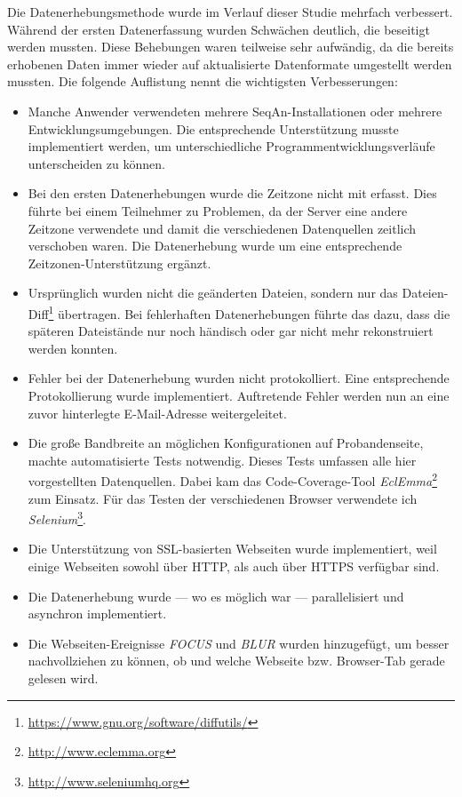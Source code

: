Die Datenerhebungsmethode wurde im Verlauf dieser Studie mehrfach verbessert. Während der ersten Datenerfassung wurden Schwächen deutlich, die beseitigt werden mussten. Diese Behebungen waren teilweise sehr aufwändig, da die bereits erhobenen Daten immer wieder auf aktualisierte Datenformate umgestellt werden mussten. Die folgende Auflistung nennt die wichtigsten Verbesserungen: \label{sec:datenerhebung-probleme}
\begin{itemize}
  \item Manche Anwender verwendeten mehrere SeqAn-Installationen oder mehrere Entwicklungsumgebungen. Die entsprechende Unterstützung musste implementiert werden, um unterschiedliche Programmentwicklungsverläufe unterscheiden zu können.
  \item Bei den ersten Datenerhebungen wurde die Zeitzone nicht mit erfasst. Dies führte bei einem Teilnehmer zu Problemen, da der Server eine andere Zeitzone verwendete und damit die verschiedenen Datenquellen zeitlich verschoben waren. Die Datenerhebung wurde um eine entsprechende Zeitzonen-Unterstützung ergänzt.
  \item Ursprünglich wurden nicht die geänderten Dateien, sondern nur das Dateien-Diff\footnote{\url{https://www.gnu.org/software/diffutils/}} übertragen. Bei fehlerhaften Datenerhebungen führte das dazu, dass die späteren Dateistände nur noch händisch oder gar nicht mehr rekonstruiert werden konnten.
  \item Fehler bei der Datenerhebung wurden nicht protokolliert. Eine entsprechende Protokollierung wurde implementiert. Auftretende Fehler werden nun an eine zuvor hinterlegte E-Mail-Adresse weitergeleitet.
  \item Die große Bandbreite an möglichen Konfigurationen auf Probandenseite, machte automatisierte Tests notwendig. Dieses Tests umfassen alle hier vorgestellten Datenquellen. Dabei kam das Code-Coverage-Tool \textit{EclEmma}\footnote{\url{http://www.eclemma.org}} zum Einsatz. Für das Testen der verschiedenen Browser verwendete ich \textit{Selenium}\footnote{\url{http://www.seleniumhq.org}}.
  \item Die Unterstützung von SSL-basierten Webseiten wurde implementiert, weil einige Webseiten sowohl über HTTP, als auch über HTTPS verfügbar sind.
  \item Die Datenerhebung wurde --- wo es möglich war --- parallelisiert und asynchron implementiert.
  \item Die Webseiten-Ereignisse \textit{FOCUS} und \textit{BLUR} wurden hinzugefügt, um besser nachvollziehen zu können, ob und welche Webseite bzw. Browser-Tab gerade gelesen wird.
\end{itemize}

